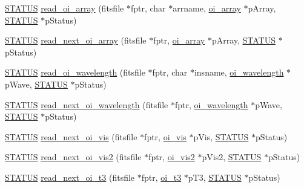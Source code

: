 \begin{DoxyCompactItemize}
\item 
\hyperlink{group__oitable_ga0cb9c7fae5afe4237eb4d5d43318fa18}{STATUS} \hyperlink{group__oitable_ga5dcb2c1f0b5945c505312bf7d74a0406}{read\_\-oi\_\-array} (fitsfile $\ast$fptr, char $\ast$arrname, \hyperlink{structoi__array}{oi\_\-array} $\ast$pArray, \hyperlink{group__oitable_ga0cb9c7fae5afe4237eb4d5d43318fa18}{STATUS} $\ast$pStatus)
\item 
\hyperlink{group__oitable_ga0cb9c7fae5afe4237eb4d5d43318fa18}{STATUS} \hyperlink{group__oitable_gab54477593012c35dd5330f6a4001d3f1}{read\_\-next\_\-oi\_\-array} (fitsfile $\ast$fptr, \hyperlink{structoi__array}{oi\_\-array} $\ast$pArray, \hyperlink{group__oitable_ga0cb9c7fae5afe4237eb4d5d43318fa18}{STATUS} $\ast$pStatus)
\item 
\hyperlink{group__oitable_ga0cb9c7fae5afe4237eb4d5d43318fa18}{STATUS} \hyperlink{group__oitable_gabd408e019a9889c75d3791b682ec9a37}{read\_\-oi\_\-wavelength} (fitsfile $\ast$fptr, char $\ast$insname, \hyperlink{structoi__wavelength}{oi\_\-wavelength} $\ast$pWave, \hyperlink{group__oitable_ga0cb9c7fae5afe4237eb4d5d43318fa18}{STATUS} $\ast$pStatus)
\item 
\hyperlink{group__oitable_ga0cb9c7fae5afe4237eb4d5d43318fa18}{STATUS} \hyperlink{group__oitable_ga3dce8694156456cdebb077eaa7a9cce2}{read\_\-next\_\-oi\_\-wavelength} (fitsfile $\ast$fptr, \hyperlink{structoi__wavelength}{oi\_\-wavelength} $\ast$pWave, \hyperlink{group__oitable_ga0cb9c7fae5afe4237eb4d5d43318fa18}{STATUS} $\ast$pStatus)
\item 
\hyperlink{group__oitable_ga0cb9c7fae5afe4237eb4d5d43318fa18}{STATUS} \hyperlink{group__oitable_gaaf96668094b9b3c353a700e700f6d13e}{read\_\-next\_\-oi\_\-vis} (fitsfile $\ast$fptr, \hyperlink{structoi__vis}{oi\_\-vis} $\ast$pVis, \hyperlink{group__oitable_ga0cb9c7fae5afe4237eb4d5d43318fa18}{STATUS} $\ast$pStatus)
\item 
\hyperlink{group__oitable_ga0cb9c7fae5afe4237eb4d5d43318fa18}{STATUS} \hyperlink{group__oitable_ga28b44f612e1d227e021ce07279956375}{read\_\-next\_\-oi\_\-vis2} (fitsfile $\ast$fptr, \hyperlink{structoi__vis2}{oi\_\-vis2} $\ast$pVis2, \hyperlink{group__oitable_ga0cb9c7fae5afe4237eb4d5d43318fa18}{STATUS} $\ast$pStatus)
\item 
\hyperlink{group__oitable_ga0cb9c7fae5afe4237eb4d5d43318fa18}{STATUS} \hyperlink{group__oitable_ga09a99c8cfaefda026cbaafb8ff1cf6da}{read\_\-next\_\-oi\_\-t3} (fitsfile $\ast$fptr, \hyperlink{structoi__t3}{oi\_\-t3} $\ast$pT3, \hyperlink{group__oitable_ga0cb9c7fae5afe4237eb4d5d43318fa18}{STATUS} $\ast$pStatus)

\end{DoxyCompactItemize}
